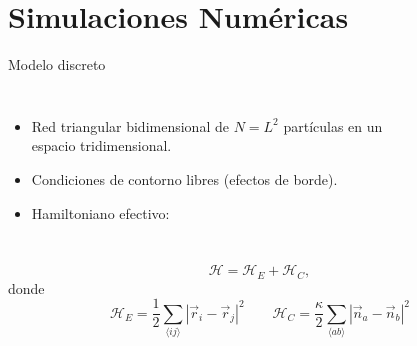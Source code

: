 \documentclass[xcolor=dvipsnames]{beamer}
\begin{document}
\section{Simulaciones Numéricas}
\begin{frame}{Modelo discreto}
\begin{columns}[T]
    \begin{itemize}
    \item Red triangular bidimensional de $N=L^2$ partículas en un espacio
      tridimensional.
    \item Condiciones de contorno libres (efectos de borde).
    \item  Hamiltoniano efectivo:
    \end{itemize}
    \begin{figure}[h]
      \resizebox{\columnwidth}{!}{}
    \end{figure} 
\end{columns}
\begin{equation*}
\mathcal{H}=\mathcal{H}_E+\mathcal{H}_C,
\end{equation*}
donde
 $$\mathcal{H}_E=\frac{1}{2}\sum_{\langle
   ij\rangle}|\vec{r}_i-\vec{r}_j|^2 \qquad \mathcal{H}_C=\frac{\kappa}{2}\sum_{\langle ab 
      \rangle}|\vec{n}_a-\vec{n}_b|^2$$
\end{frame}
\end{document}

